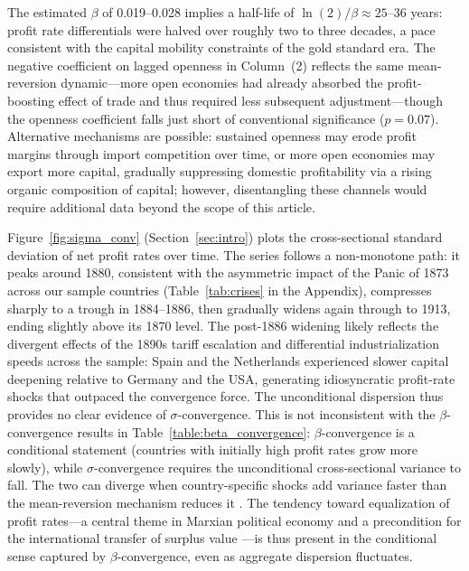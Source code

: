 \documentclass[10pt]{article}
\begin{document}
\par The estimated $\beta$ of 0.019--0.028 implies a half-life of $\ln(2)/\beta \approx 25$--$36$ years: profit rate differentials were halved over roughly two to three decades, a pace consistent with the capital mobility constraints of the gold standard era. The negative coefficient on lagged openness in Column~(2) reflects the same mean-reversion dynamic---more open economies had already absorbed the profit-boosting effect of trade and thus required less subsequent adjustment---though the openness coefficient falls just short of conventional significance ($p=0.07$). Alternative mechanisms are possible: sustained openness may erode profit margins through import competition over time, or more open economies may export more capital, gradually suppressing domestic profitability via a rising organic composition of capital; however, disentangling these channels would require additional data beyond the scope of this article.

\par Figure~\ref{fig:sigma_conv} (Section~\ref{sec:intro}) plots the cross-sectional standard deviation of net profit rates over time. The series follows a non-monotone path: it peaks around 1880, consistent with the asymmetric impact of the Panic of 1873 across our sample countries (Table~\ref{tab:crises} in the Appendix), compresses sharply to a trough in 1884--1886, then gradually widens again through to 1913, ending slightly above its 1870 level. The post-1886 widening likely reflects the divergent effects of the 1890s tariff escalation and differential industrialization speeds across the sample: Spain and the Netherlands experienced slower capital deepening relative to Germany and the USA, generating idiosyncratic profit-rate shocks that outpaced the convergence force. The unconditional dispersion thus provides no clear evidence of $\sigma$-convergence. This is not inconsistent with the $\beta$-convergence results in Table~\ref{table:beta_convergence}: $\beta$-convergence is a conditional statement (countries with initially high profit rates grow more slowly), while $\sigma$-convergence requires the unconditional cross-sectional variance to fall. The two can diverge when country-specific shocks add variance faster than the mean-reversion mechanism reduces it \citep{BarroSalaIMartin1997}. The tendency toward equalization of profit rates---a central theme in Marxian political economy and a precondition for the international transfer of surplus value \citep{Ricci2019, emmanuel1972unequal}---is thus present in the conditional sense captured by $\beta$-convergence, even as aggregate dispersion fluctuates.
\end{document}
